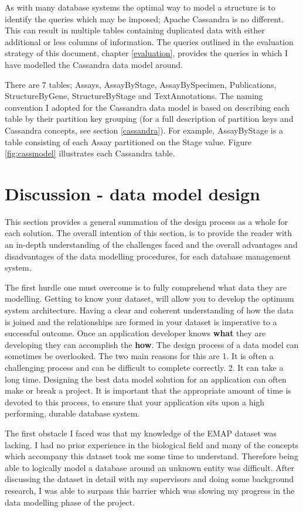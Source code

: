 As with many database systems the optimal way to model a structure is to identify the queries which may be imposed; Apache Cassandra is no different. This can result in multiple tables containing duplicated data with either additional or less columns of information. The queries outlined in the evaluation strategy of this document, chapter \ref{evaluation}, provides the queries in which I have modelled the Cassandra data model around.

There are 7 tables; Assays, AssayByStage, AssayBySpecimen, Publications, StructureByGene, StructureByStage and TextAnnotations. The naming convention I adopted for the Cassandra data model is based on describing each table by their partition key grouping (for a full description of partition keys and Cassandra concepts, see section \ref{cassandra}). For example, AssayByStage is a table consisting of each Assay partitioned on the Stage value. Figure \ref{fig:cassmodel} illustrates each Cassandra table.
\newpage
\section{Discussion - data model design}\label{designdiscussion}
This section provides a general summation of the design process as a whole for each solution. The overall intention of this section, is to provide the reader with an in-depth understanding of the challenges faced and the overall advantages and disadvantages of the data modelling procedures, for each database management system.

The first hurdle one must overcome is to fully comprehend what data they are modelling. Getting to know your dataset, will allow you to develop the optimum system architecture. Having a clear and coherent understanding of how the data is joined and the relationships are formed in your dataset is imperative to a successful outcome. Once an application developer knows \textbf{what} they are developing they can accomplish the \textbf{how}. The design process of a data model can sometimes be overlooked. The two main reasons for this are 1. It is often a challenging process and can be difficult to complete correctly. 2. It can take a long time. Designing the best data model solution for an application can often make or break a project. It is important that the appropriate amount of time is devoted to this process, to ensure that your application sits upon a high performing, durable database system.

The first obstacle I faced was that my knowledge of the EMAP dataset was lacking. I had no prior experience in the biological field and many of the concepts which accompany this dataset took me some time to understand. Therefore being able to logically model a database around an unknown entity was difficult. After discussing the dataset in detail with my supervisors and doing some background research, I was able to surpass this barrier which was slowing my progress in the data modelling phase of the project.

